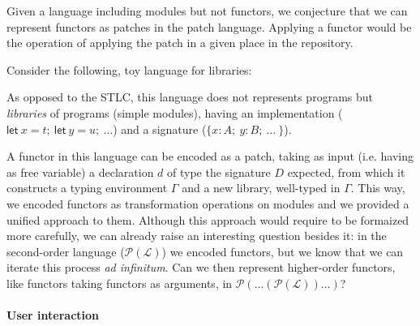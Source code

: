 \documentclass[twoside,a4paper,12pt]{article}
\begin{document}
Given a language including modules but not functors, we conjecture
that we can represent functors as patches in the patch language.
Applying a functor would be the operation of applying the patch in a
given place in the repository.

Consider the following, toy language for libraries:

As opposed to the STLC, this language does not represents programs but
\emph{libraries} of programs (simple modules), having an
implementation ($\mathsf{let}\ x=t;\ \mathsf{let}\ y=u;\ \ldots$) and
a signature ($\{x:A;\ y:B;\ \ldots\ \}$).

A functor in this language can be encoded as a patch, taking as input
(i.e. having as free variable) a declaration $d$ of type the signature
$D$ expected, from which it constructs a typing environment $\Gamma$
and a new library, well-typed in $\Gamma$. This way, we encoded
functors as transformation operations on modules and we provided a
unified approach to them. Although this approach would require to be
formaized more carefully, we can already raise an interesting question
besides it: in the second-order language ($\mathcal P(\mathcal L)$) we
encoded functors, but we know that we can iterate this process
\emph{ad infinitum}. Can we then represent higher-order functors, like
functors taking functors as arguments, in $\mathcal P(\ldots (\mathcal
P(\mathcal L))\ldots)$?

\paragraph{User interaction}
\end{document}

